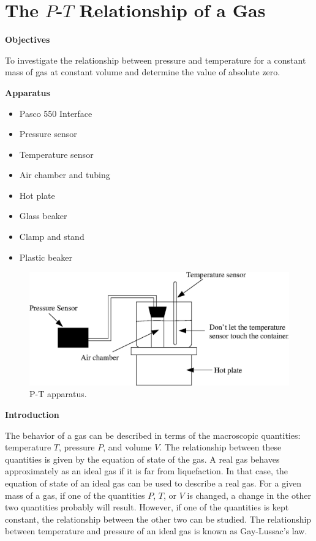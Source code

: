 
\section{The $P$-$T$ Relationship of a Gas}

\makelabheader %

\bigskip
\textbf{Objectives} 

To investigate the relationship between pressure and temperature for
a constant mass of gas at constant volume and determine the value
of absolute zero.

\bigskip

\textbf{Apparatus} 

\begin{itemize}[nosep]
\item Pasco 550 Interface
\item Pressure sensor
\item Temperature sensor
\item Air chamber and tubing
\item Hot plate
\item Glass beaker
\item Clamp and stand
\item Plastic beaker
\end{itemize}
\vspace{0.3cm}

\begin{figure}[hbt]
\begin{center}
\includegraphics[width=6.0in]{P-T_relationship_of_gas/P-T_fig1b.eps}
\caption{P-T apparatus.}
\end{center}
\end{figure}

\textbf{Introduction}

The behavior of a gas can be described in terms of the macroscopic quantities:
temperature $T$, pressure $P$, and volume $V$. The relationship between these
quantities is given by the equation of state of the gas. A real gas behaves
approximately as an ideal gas if it is far from liquefaction. In that case,
the equation of state of an ideal gas can be used to describe a real gas. For
a given mass of a gas, if one of the quantities $P$, $T$, or $V$ is changed, a change
in the other two quantities probably will result. However, if one of the 
quantities is kept constant, the relationship between the other two can be 
studied. The relationship between temperature and pressure of an ideal gas is 
known as Gay-Lussac's law.

